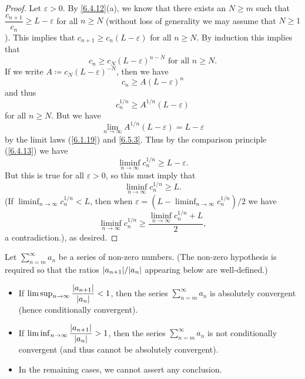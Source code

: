 \begin{proof}
  Let \(\varepsilon > 0\).
  By \cref{6.4.12}(a), we know that there exists an \(N \geq m\) such that \(\dfrac{c_{n + 1}}{c_n} \geq L - \varepsilon\) for all \(n \geq N\)
  (without loss of generality we may assume that \(N \geq 1\)).
  This implies that \(c_{n + 1} \geq c_n (L - \varepsilon)\) for all \(n \geq N\).
  By induction this implies that
  \[
    c_n \geq c_N (L - \varepsilon)^{n - N} \text{ for all } n \geq N.
  \]
  If we write \(A \coloneqq c_N (L - \varepsilon)^{-N}\), then we have
  \[
    c_n \geq A(L - \varepsilon)^n
  \]
  and thus
  \[
    c_n^{1 / n} \geq A^{1 / n} (L - \varepsilon)
  \]
  for all \(n \geq N\).
  But we have
  \[
    \lim_{n \to \infty} A^{1 / n} (L - \varepsilon) = L - \varepsilon
  \]
  by the limit laws (\cref{6.1.19}) and \cref{6.5.3}.
  Thus by the comparison principle (\cref{6.4.13}) we have
  \[
    \liminf_{n \to \infty} c_n^{1 / n} \geq L - \varepsilon.
  \]
  But this is true for all \(\varepsilon > 0\), so this must imply that
  \[
    \liminf_{n \to \infty} c_n^{1 / n} \geq L.
  \]
  (If \(\liminf_{n \to \infty} c_n^{1 / n} < L\), then when \(\varepsilon = (L - \liminf_{n \to \infty} c_n^{1 / n}) / 2\) we have
  \[
    \liminf_{n \to \infty} c_n^{1 / n} \geq \dfrac{\liminf_{n \to \infty} c_n^{1 / n} + L}{2},
  \]
  a contradiction.), as desired.
\end{proof}

\begin{cor}\label{7.5.3}
  Let \(\sum_{n = m}^\infty a_n\) be a series of non-zero numbers.
  (The non-zero hypothesis is required so that the ratios \(\abs{a_{n + 1}} / \abs{a_n}\) appearing below are well-defined.)
  \begin{itemize}
    \item If \(\limsup_{n \to \infty} \dfrac{\left\lvert a_{n + 1}\right\rvert}{\left\lvert a_n\right\rvert} < 1\), then the series \(\sum_{n = m}^\infty a_n\) is absolutely convergent (hence conditionally convergent).
    \item If \(\liminf_{n \to \infty} \dfrac{\left\lvert a_{n + 1}\right\rvert}{\left\lvert a_n\right\rvert} > 1\), then the series \(\sum_{n = m}^\infty a_n\) is not conditionally convergent (and thus cannot be absolutely convergent).
    \item In the remaining cases, we cannot assert any conclusion.
  \end{itemize}
\end{cor}

